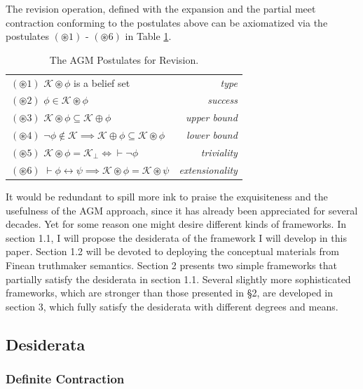 \documentclass[12pt]{article}
\newcommand{\K}{\mathcal{K}}
\newcommand{\ostar}{\circledast}
\begin{document}
The revision operation, defined with the expansion and the partial meet contraction conforming to the postulates above can be axiomatized via the postulates $(\ostar1) \text{ - } (\ostar6)$ in Table \ref{tab:revision}. 
\begin{table}[htpb]
\centering
\begin{tabular}{lr}
\hline
$(\ostar1)$ $\K \ostar \phi$ is a belief set & \textit{type} \\
$(\ostar2)$ $\phi \in \K \ostar \phi$ & \textit{success} \\
$(\ostar3)$ $\K \ostar \phi \subseteq \K \oplus \phi$ & \textit{upper bound} \\
$(\ostar4)$ $\lnot \phi \notin \K \implies \K \oplus \phi \subseteq \K \ostar \phi$ & \textit{lower bound} \\
$(\ostar5)$ $\K \ostar \phi = \K_{\bot} \iff \vdash \lnot \phi$ & \textit{triviality}\\
$(\ostar6)$ $\vdash \phi \leftrightarrow \psi \implies \K \ostar \phi = \K \ostar \psi$ & \textit{extensionality} \\
\hline
\end{tabular}
\caption{The AGM Postulates for Revision.}
\label{tab:revision}
\end{table}
\par
It would be redundant to spill more ink to praise the exquisiteness and the usefulness of the AGM approach, since it has already been appreciated for several decades. Yet for some reason one might desire different kinds of frameworks. In section 1.1, I will propose the desiderata of the framework I will develop in this paper. Section 1.2 will be devoted to deploying the conceptual materials from Finean truthmaker semantics. Section 2 presents two simple frameworks that partially satisfy the desiderata in section 1.1. Several slightly more sophisticated frameworks, which are stronger than those presented in \S 2, are developed in section 3, which fully satisfy the desiderata with different degrees and means.
\subsection{Desiderata}
\subsubsection{Definite Contraction}
\end{document}
